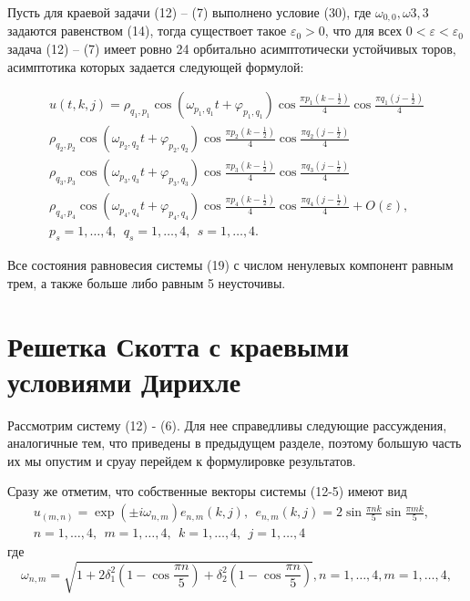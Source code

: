 \documentclass[12pt]{article}  %
\begin{document}
\begin{Th}
	Пусть для краевой задачи (12) \--- (7) выполнено условие (30), где $\omega_{0,0},\omega{3,3}$ задаются равенством (14), тогда существоет такое $\varepsilon_0>0$, что для всех $0<\varepsilon<\varepsilon_0$ задача (12) \--- (7) имеет ровно 24 орбитально асимптотически устойчивых торов, асимптотика которых задается следующей формулой:
\end{Th}
\begin{multline}
u(t,k,j)=\rho_{q_1,p_1}\cos(\omega_{p_1,q_1}t + \varphi_{p_1,q_1})\cos\frac{\pi p_1(k-\frac12)}4\cos\frac{\pi q_1(j-\frac12)}{4}\\
\rho_{q_2,p_2}\cos(\omega_{p_2,q_2}t + \varphi_{p_2,q_2})\cos\frac{\pi p_2(k-\frac12)}4\cos\frac{\pi q_2(j-\frac12)}{4}\\
\rho_{q_3,p_3}\cos(\omega_{p_3,q_3}t + \varphi_{p_3,q_3})\cos\frac{\pi p_3(k-\frac12)}4\cos\frac{\pi q_3(j-\frac12)}{4}\\
\rho_{q_4,p_4}\cos(\omega_{p_4,q_4}t + \varphi_{p_4,q_4})\cos\frac{\pi p_4(k-\frac12)}4\cos\frac{\pi q_4(j-\frac12)}{4} + O(\varepsilon),\\
p_s=1,\dots,4,\ \ q_s=1,\dots,4,\ \ s=1,\dots,4.\ \ 
\end{multline}
\begin{Th}
	Все состояния равновесия системы (19) с числом ненулевых компонент равным трем, а также больше либо равным 5 неусточивы.
\end{Th}
\section{Решетка Скотта с краевыми условиями Дирихле}
Рассмотрим систему (12) - (6). Для нее справедливы следующие рассуждения, аналогичные тем, что приведены в предыдущем разделе, поэтому большую часть их мы опустим и сруау перейдем к формулировке результатов.

Сразу же отметим, что собственные векторы системы (12-5) имеют вид
\begin{equation}
\begin{split}
u_{(m,n)}=\exp(\pm i\omega_{n,m})e_{n,m}(k,j), \ \ e_{n,m}(k,j) = 2\sin\frac{\pi nk}{5}\sin\frac{\pi mk}{5},&\\
n=1,\dots,4, \ \ m=1,\dots,4, \ \ k=1,\dots,4, \ \ j=1,\dots,4&
\end{split}
\end{equation}
где
\begin{equation}
\omega_{n,m}=\sqrt{1+2\delta^2_1\left(1-\cos\frac{\pi n}5\right)+\delta^2_2\left(1-\cos\frac{\pi n}5\right)}, n=1,\dots,4, m=1,\dots,4,
\end{equation}
\end{document}

